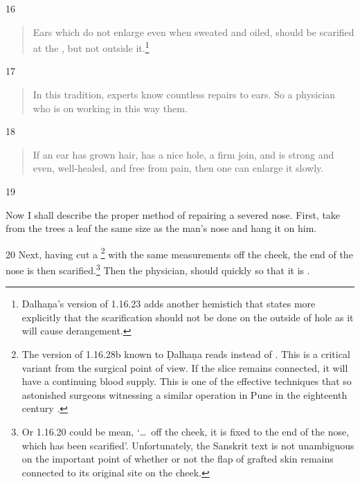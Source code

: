 \begin{translation}
    \item[16]
        \begin{verse}
    Ears which do not enlarge even when sweated and oiled, 
    should be scarified
    at the , but not outside it.\footnote{Dalhaṇa's version of 
    1.16.23 adds another hemistich that states more explicitly that the scarification should not 
    be done on the outside of hole as it will cause derangement.}  
        \end{verse}
    
    \item[17]
          \begin{verse}
    In this tradition, experts know countless repairs to ears.  So a 
    physician who is  on working in this way 
     them.
        \end{verse}
    
    \item[18]
           \begin{verse}
    If an ear has grown hair, has a nice hole, a firm join, and is strong and
    even, well-healed, and free from pain, then one can enlarge it slowly.
        \end{verse}
    
    \item[19]
    
    Now I shall describe the proper method of repairing a severed nose.
    First, take from the trees a leaf the same size as the man's nose and hang it
    on him. 
    
    \item[20] Next, having cut a \footnote{The
    version of 1.16.28b known to Ḍalhaṇa \citep[81]{vulgate} reads  instead of .
    This is a critical variant from the surgical point of view.  If the slice remains
    connected, it will have a continuing blood supply.  This is one of the effective 
    techniques that so astonished surgeons witnessing a similar operation in Pune in
    the eighteenth century \citep[see][67--70]{wuja-2003}.} with the same
    measurements off the cheek, the end of the nose is then scarified.\footnote{Or 1.16.20 could be mean, 
    `\ldots\ off the cheek, it is fixed to the end of the nose, which has been
    scarified'. Unfortunately, the Sanskrit text is not unambiguous on the
    important point of whether or not the flap of grafted skin remains connected
    to its original site on the cheek.} %
%
Then the  physician, 
    should quickly  so that it is 
    .
    

\end{translation}

